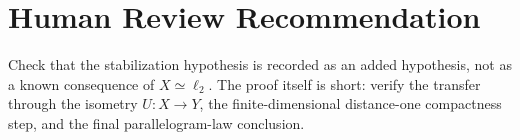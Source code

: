 \documentclass[11pt]{article}
\newcommand{\ellTwo}{\ell_2}
\begin{document}
\section*{Human Review Recommendation}

Check that the stabilization hypothesis is recorded as an added hypothesis,
not as a known consequence of \(X\simeq\ellTwo\). The proof itself is short:
verify the transfer through the isometry \(U:X\to Y\), the finite-dimensional
distance-one compactness step, and the final parallelogram-law conclusion.
\end{document}
